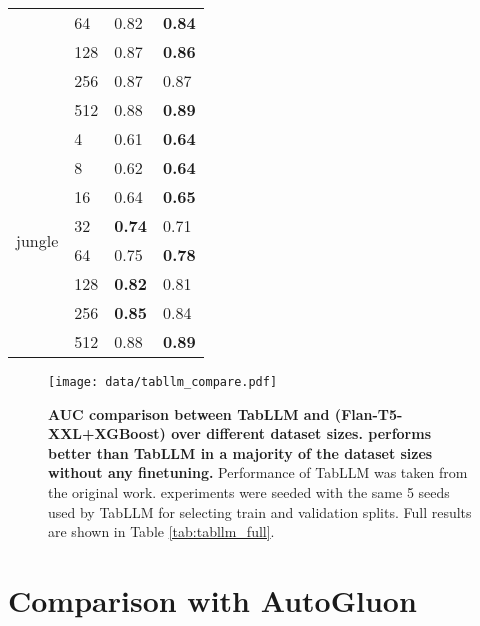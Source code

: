 \begin{table}[H]
{\begin{tabular}{llll}
           & 64   & 0.82      & \textbf{0.84}   \\
           & 128  & 0.87      & \textbf{0.86}   \\
           & 256  & 0.87      & 0.87   \\
           & 512  & 0.88      & \textbf{0.89}   \\
\hline
\multirow{8}{*}{jungle}     
           & 4    & 0.61      & \textbf{0.64}   \\
           & 8    & 0.62      & \textbf{0.64}   \\
           & 16   & 0.64      & \textbf{0.65}   \\
           & 32   & \textbf{0.74}      & 0.71   \\
           & 64   & 0.75      & \textbf{0.78}   \\
           & 128  & \textbf{0.82}      & 0.81   \\
           & 256  & \textbf{0.85}      & 0.84   \\
           & 512  & 0.88      & \textbf{0.89}   \\
\hline
\end{tabular}}
\end{table}

\begin{figure}[H]
    \centering
    {{\texttt{[image: data/tabllm\_compare.pdf]}}}%
    \caption{\textbf{AUC comparison between TabLLM and \methodname (Flan-T5-XXL+XGBoost) over different dataset sizes. \methodname performs better than TabLLM in a majority of the dataset sizes without any finetuning.} Performance of TabLLM was taken from the original work. \methodname experiments were seeded with the same 5 seeds used by TabLLM for selecting train and validation splits. Full results are shown in Table \ref{tab:tabllm_full}.}
\end{figure}



\section{Comparison with AutoGluon}
\label{autogluon}

